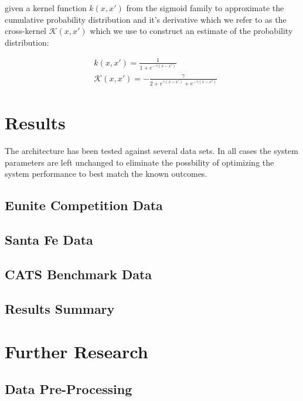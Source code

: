 \documentclass[10pt]{article}
\begin{document}
given a kernel function \( k(x,x') \) from the sigmoid family to approximate the cumulative probability distribution and it's derivative which we refer to as the cross-kernel \( \mathcal{K}(x,x') \) which we use to construct an estimate of the probability distribution:

\begin{align}
&k(x,x') = \frac{1}{1+e^{-\gamma(x-x')} } \\
&\mathcal{K}(x,x') = -\frac{\gamma}{2 + e^{\gamma(x-x')} + e^{-\gamma(x-x')} } 
\end{align}

\section{Results}
The architecture has been tested against several data sets.  In all cases the system parameters are left unchanged to eliminate the possbility of optimizing the system performance to best match the known outcomes.

\subsection{Eunite Competition Data}


\subsection{Santa Fe Data}


\subsection{CATS Benchmark Data}


\subsection{Results Summary}


\section{Further Research}

\subsection{Data Pre-Processing}

\end{document}
